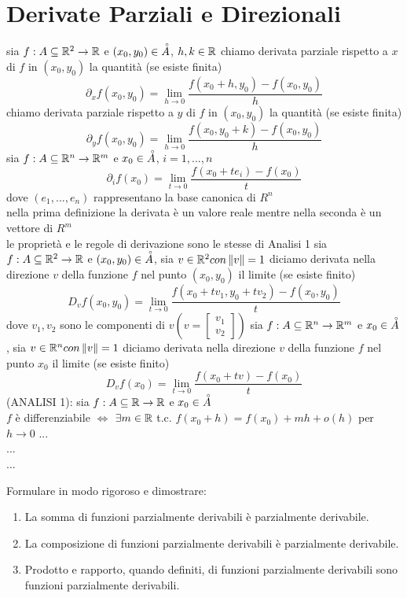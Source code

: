 \section{Derivate Parziali e Direzionali}
sia $f:A\subseteq\mathbb{R}^2\rightarrow\mathbb{R}$ e $(x_0,y_0)\in\accentset{\circ}{A}$, $h,k\in\mathbb{R}$
chiamo derivata parziale rispetto a $x$ di $f$ in $(x_0,y_0)$ la quantità (se esiste finita)
$$\partial_xf(x_0,y_0) = \lim\limits_{h\rightarrow{0}}\frac{f(x_0+h,y_0)-f(x_0,y_0)}{h}$$
chiamo derivata parziale rispetto a $y$ di $f$ in $(x_0,y_0)$ la quantità (se esiste finita)
$$\partial_yf(x_0,y_0) = \lim\limits_{h\rightarrow{0}}\frac{f(x_0,y_0+k)-f(x_0,y_0)}{h}$$
sia $f:A\subseteq\mathbb{R}^n\rightarrow\mathbb{R}^m$ e $x_0\in\accentset{\circ}{A}$, $i=1,...,n$
$$\partial_if(x_0) = \lim\limits_{t\rightarrow{0}}\frac{f(x_0+te_i)-f(x_0)}{t}$$
dove $(e_1,...,e_n)$ rappresentano la base canonica di $R^n$\\
\observation nella prima definizione la derivata è un valore reale mentre nella seconda è un vettore di $R^m$\\
\observation le proprietà e le regole di derivazione sono le stesse di Analisi 1
sia $f:A\subseteq\mathbb{R}^2\rightarrow\mathbb{R}$ e $(x_0,y_0)\in\accentset{\circ}{A}$, sia $v\in\mathbb{R}^2 con \left\|v\right\|=1 $
diciamo derivata nella direzione $v$ della funzione $f$ nel punto $(x_0,y_0)$ il limite (se esiste finito)\\
$$D_vf(x_0,y_0) = \lim\limits_{t\rightarrow{0}}\frac{f(x_0+tv_1,y_0+tv_2)-f(x_0,y_0)}{t}$$
dove $v_1,v_2$ sono le componenti di $v(v=\begin{bmatrix}v_1\\v_2\end{bmatrix})$
sia $f:A\subseteq\mathbb{R}^n\rightarrow\mathbb{R}^m$ e $x_0\in\accentset{\circ}{A}$, sia $v\in\mathbb{R}^n con \left\|v\right\|=1 $
diciamo derivata nella direzione $v$ della funzione $f$ nel punto $x_0$ il limite (se esiste finito)\\
$$D_vf(x_0) = \lim\limits_{t\rightarrow{0}}\frac{f(x_0+tv)-f(x_0)}{t}$$
\proposition
(ANALISI 1): sia $f:A\subseteq \mathbb{R}\rightarrow\mathbb{R}$ e $x_0\in\accentset{\circ}{A}$\\
$f$ è differenziabile $\Leftrightarrow$ $\exists m\in \mathbb{R} $ t.c. $f(x_0+h)=f(x_0)+mh+o(h)$ per $h\rightarrow 0$
...\\
...\\
...\\
\begin{exercise}
	\label{ex:funz_derivabili}
	Formulare in modo rigoroso e dimostrare:
	\begin{enumerate}
		\item La somma di funzioni parzialmente derivabili è parzialmente derivabile.
		\item La composizione di funzioni parzialmente derivabili è parzialmente derivabile.
		\item Prodotto e rapporto, quando definiti, di funzioni parzialmente derivabili sono funzioni parzialmente derivabili.
	\end{enumerate}
\end{exercise}

